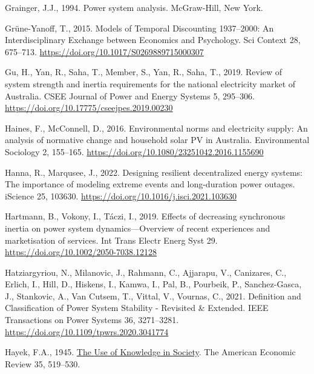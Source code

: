 \documentclass[12pt,a4paper,]{report}
\newlength{\cslhangindent}
\newenvironment{CSLReferences}[2] %
 {%
  \setlength{\parindent}{0pt}
  \ifodd #1 \everypar{\setlength{\hangindent}{\cslhangindent}}\ignorespaces\fi
  \ifnum #2 > 0
  \setlength{\parskip}{#2\baselineskip}
  \fi
 }%
 {}
\begin{document}
\begin{CSLReferences}{1}{0}
\leavevmode{}%
Grainger, J.J., 1994. Power system analysis. {McGraw-Hill}, {New York}.

\leavevmode{}%
Grüne-Yanoff, T., 2015. Models of {Temporal Discounting} 1937--2000: {An
Interdisciplinary Exchange} between {Economics} and {Psychology}. Sci
Context 28, 675--713. \url{https://doi.org/10.1017/S0269889715000307}

\leavevmode{}%
Gu, H., Yan, R., Saha, T., Member, S., Yan, R., Saha, T., 2019. Review
of system strength and inertia requirements for the national electricity
market of {Australia}. CSEE Journal of Power and Energy Systems 5,
295--306. \url{https://doi.org/10.17775/cseejpes.2019.00230}

\leavevmode{}%
Haines, F., McConnell, D., 2016. Environmental norms and electricity
supply: An analysis of normative change and household solar {PV} in
{Australia}. Environmental Sociology 2, 155--165.
\url{https://doi.org/10.1080/23251042.2016.1155690}

\leavevmode{}%
Hanna, R., Marqusee, J., 2022. Designing resilient decentralized energy
systems: {The} importance of modeling extreme events and long-duration
power outages. iScience 25, 103630.
\url{https://doi.org/10.1016/j.isci.2021.103630}

\leavevmode{}%
Hartmann, B., Vokony, I., Táczi, I., 2019. Effects of decreasing
synchronous inertia on power system dynamics---{Overview} of recent
experiences and marketisation of services. Int Trans Electr Energ Syst
29. \url{https://doi.org/10.1002/2050-7038.12128}

\leavevmode{}%
Hatziargyriou, N., Milanovic, J., Rahmann, C., Ajjarapu, V., Canizares,
C., Erlich, I., Hill, D., Hiskens, I., Kamwa, I., Pal, B., Pourbeik, P.,
Sanchez-Gasca, J., Stankovic, A., Van Cutsem, T., Vittal, V., Vournas,
C., 2021. Definition and {Classification} of {Power System Stability} -
{Revisited} \& {Extended}. IEEE Transactions on Power Systems 36,
3271--3281. \url{https://doi.org/10.1109/tpwrs.2020.3041774}

\leavevmode{}%
Hayek, F.A., 1945. \href{https://www.jstor.org/stable/1809376}{The {Use}
of {Knowledge} in {Society}}. The American Economic Review 35, 519--530.


\end{CSLReferences}
\end{document}
